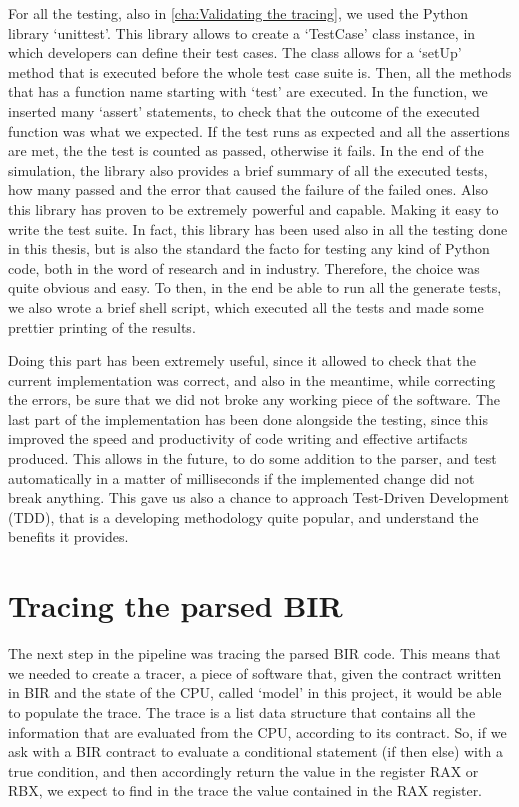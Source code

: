 For all the testing, also in \cref{cha:Validating the tracing}, we used the Python
library `unittest'. This library allows to create a `TestCase' class instance, in
which developers can define their test cases. The class allows for a `setUp'
method that is executed before the whole test case suite is. Then, all the
methods that has a function name starting with `test' are executed. In the function,
we inserted many `assert' statements, to check that the outcome of the executed function
was what we expected. If the test runs as expected and all the assertions are
met, the the test is counted as passed, otherwise it fails. In the end of the simulation,
the library also provides a brief summary of all the executed tests, how many passed
and the error that caused the failure of the failed ones. Also this library has
proven to be extremely powerful and capable. Making it easy to write the test suite.
In fact, this library has been used also in all the testing done in this thesis,
but is also the standard the facto for testing any kind of Python code, both in the
word of research and in industry. Therefore, the choice was quite obvious and easy.
To then, in the end be able to run all the generate tests, we also wrote a brief
shell script, which executed all the tests and made some prettier printing of the
results.

Doing this part has been extremely useful, since it allowed to check that the
current implementation was correct, and also in the meantime, while correcting
the errors, be sure that we did not broke any working piece of the software. The
last part of the implementation has been done alongside the testing, since this improved
the speed and productivity of code writing and effective artifacts produced.
This allows in the future, to do some addition to the parser, and test
automatically in a matter of milliseconds if the implemented change did not
break anything. This gave us also a chance to approach Test-Driven Development (TDD),
that is a developing methodology quite popular, and understand the benefits it provides.

\section{Tracing the parsed BIR}
\label{cha:Tracing the parsed BIR} The next step in the pipeline was tracing the
parsed BIR code. This means that we needed to create a tracer, a piece of software
that, given the contract written in BIR and the state of the CPU, called `model'
in this project, it would be able to populate the trace. The trace is a list data
structure that contains all the information that are evaluated from the CPU,
according to its contract. So, if we ask with a BIR contract to evaluate a
conditional statement (if then else) with a true condition, and then accordingly
return the value in the register RAX or RBX, we expect to find in the trace the
value contained in the RAX register.

